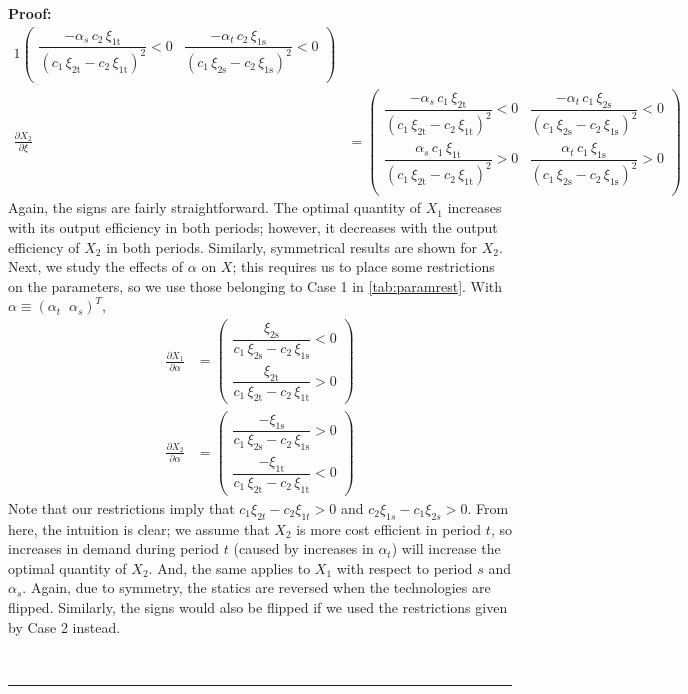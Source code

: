 \documentclass[11pt,a4paper,leqno]{extarticle}
\newenvironment{proof}[1][Proof]{\noindent\textbf{#1:} }{\ \rule{0.5em}{0.5em}}
\begin{document}
\begin{proof}
\begin{alignat*}{1}
\begin{pmatrix}
		\dfrac{-\alpha _{s}\,c_{2}\,\xi _{\mathrm{1t}}}{{\left(c_{1}\,\xi _{\mathrm{2t}}-c_{2}\,\xi _{\mathrm{1t}}\right)}^2}<0 & \dfrac{-\alpha _{t}\,c_{2}\,\xi _{\mathrm{1s}}}{{\left(c_{1}\,\xi _{\mathrm{2s}}-c_{2}\,\xi _{\mathrm{1s}}\right)}^2}<0 \\
		\end{pmatrix}\\
		\frac{\partial X_2}{\partial \xi} &= 
		\begin{pmatrix}
		\dfrac{-\alpha _{s}\,c_{1}\,\xi _{\mathrm{2t}}}{{\left(c_{1}\,\xi _{\mathrm{2t}}-c_{2}\,\xi _{\mathrm{1t}}\right)}^2} <0& \dfrac{-\alpha _{t}\,c_{1}\,\xi _{\mathrm{2s}}}{{\left(c_{1}\,\xi _{\mathrm{2s}}-c_{2}\,\xi _{\mathrm{1s}}\right)}^2} <0\\
		\dfrac{\alpha _{s}\,c_{1}\,\xi _{\mathrm{1t}}}{{\left(c_{1}\,\xi _{\mathrm{2t}}-c_{2}\,\xi _{\mathrm{1t}}\right)}^2}>0& \dfrac{\alpha _{t}\,c_{1}\,\xi _{\mathrm{1s}}}{{\left(c_{1}\,\xi _{\mathrm{2s}}-c_{2}\,\xi _{\mathrm{1s}}\right)}^2} >0\\
		\end{pmatrix}
		\end{alignat*}
		Again, the signs are fairly straightforward. The optimal quantity of $X_1$ increases with its output efficiency in both periods; however, it decreases with the output efficiency of $X_2$ in both periods. Similarly, symmetrical results are shown for $X_2$. Next, we study the effects of $\alpha$ on $X$; this requires us to place some restrictions on the parameters, so we use those belonging to Case 1 in \autoref{tab:paramrest}. With $\alpha \equiv \left( \alpha_t \;\; \alpha_s \right)^T$, 
		\begin{align*}
		\frac{\partial X_1}{\partial \alpha} &= 
		\begin{pmatrix}
		\dfrac{\xi _{\mathrm{2s}}}{c_{1}\,\xi _{\mathrm{2s}}-c_{2}\,\xi _{\mathrm{1s}}}<0 \\
		\dfrac{\xi _{\mathrm{2t}}}{c_{1}\,\xi _{\mathrm{2t}}-c_{2}\,\xi _{\mathrm{1t}}}>0
		\end{pmatrix}\\
		\frac{\partial X_2}{\partial \alpha} &= 
		\begin{pmatrix}
		\dfrac{-\xi _{\mathrm{1s}}}{c_{1}\,\xi _{\mathrm{2s}}-c_{2}\,\xi _{\mathrm{1s}}}>0 \\
		\dfrac{-\xi _{\mathrm{1t}}}{c_{1}\,\xi _{\mathrm{2t}}-c_{2}\,\xi _{\mathrm{1t}}}<0
		\end{pmatrix}
		\end{align*}
		Note that our restrictions imply that $c_1 \xi_{2t} - c_2 \xi_{1t} > 0$ and $c_2 \xi_{1s} - c_1 \xi_{2s} > 0$. From here, the intuition is clear; we assume that $X_2$ is more cost efficient in period $t$, so increases in demand during period $t$ (caused by increases in $\alpha_t$) will increase the optimal quantity of $X_2$. And, the same applies to $X_1$ with respect to period $s$ and $\alpha_s$. Again, due to symmetry, the statics are reversed when the technologies are flipped. Similarly, the signs would also be flipped if we used the restrictions given by Case 2 instead. 
		

\end{proof}
\end{document}
